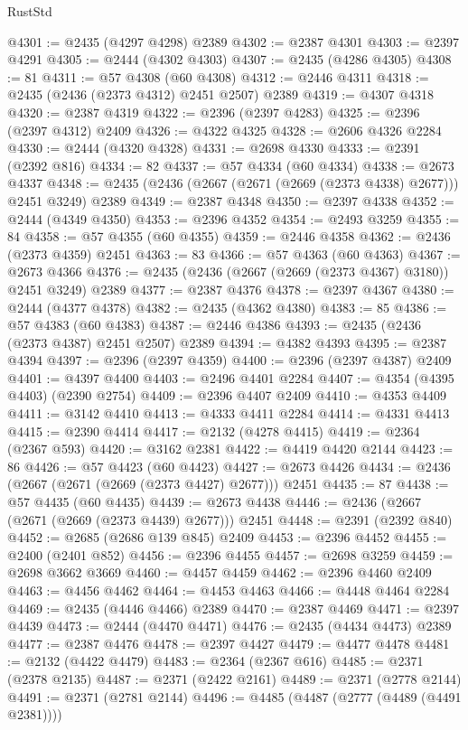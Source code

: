 \begin{lexlean}{RustStd}
\begin{coremodule}
@4301 := @2435 (@4297 @4298) @2389
@4302 := @2387 @4301
@4303 := @2397 @4291
@4305 := @2444 (@4302 @4303)
@4307 := @2435 (@4286 @4305)
@4308 := 81
@4311 := @57 @4308 (@60 @4308)
@4312 := @2446 @4311
@4318 := @2435 (@2436 (@2373 @4312) @2451 @2507) @2389
@4319 := @4307 @4318
@4320 := @2387 @4319
@4322 := @2396 (@2397 @4283)
@4325 := @2396 (@2397 @4312) @2409
@4326 := @4322 @4325
@4328 := @2606 @4326 @2284
@4330 := @2444 (@4320 @4328)
@4331 := @2698 @4330
@4333 := @2391 (@2392 @816)
@4334 := 82
@4337 := @57 @4334 (@60 @4334)
@4338 := @2673 @4337
@4348 := @2435 (@2436 (@2667 (@2671 (@2669 (@2373 @4338) @2677))) @2451 @3249) @2389
@4349 := @2387 @4348
@4350 := @2397 @4338
@4352 := @2444 (@4349 @4350)
@4353 := @2396 @4352
@4354 := @2493 @3259
@4355 := 84
@4358 := @57 @4355 (@60 @4355)
@4359 := @2446 @4358
@4362 := @2436 (@2373 @4359) @2451
@4363 := 83
@4366 := @57 @4363 (@60 @4363)
@4367 := @2673 @4366
@4376 := @2435 (@2436 (@2667 (@2669 (@2373 @4367) @3180)) @2451 @3249) @2389
@4377 := @2387 @4376
@4378 := @2397 @4367
@4380 := @2444 (@4377 @4378)
@4382 := @2435 (@4362 @4380)
@4383 := 85
@4386 := @57 @4383 (@60 @4383)
@4387 := @2446 @4386
@4393 := @2435 (@2436 (@2373 @4387) @2451 @2507) @2389
@4394 := @4382 @4393
@4395 := @2387 @4394
@4397 := @2396 (@2397 @4359)
@4400 := @2396 (@2397 @4387) @2409
@4401 := @4397 @4400
@4403 := @2496 @4401 @2284
@4407 := @4354 (@4395 @4403) (@2390 @2754)
@4409 := @2396 @4407 @2409
@4410 := @4353 @4409
@4411 := @3142 @4410
@4413 := @4333 @4411 @2284
@4414 := @4331 @4413
@4415 := @2390 @4414
@4417 := @2132 (@4278 @4415)
@4419 := @2364 (@2367 @593)
@4420 := @3162 @2381
@4422 := @4419 @4420 @2144
@4423 := 86
@4426 := @57 @4423 (@60 @4423)
@4427 := @2673 @4426
@4434 := @2436 (@2667 (@2671 (@2669 (@2373 @4427) @2677))) @2451
@4435 := 87
@4438 := @57 @4435 (@60 @4435)
@4439 := @2673 @4438
@4446 := @2436 (@2667 (@2671 (@2669 (@2373 @4439) @2677))) @2451
@4448 := @2391 (@2392 @840)
@4452 := @2685 (@2686 @139 @845) @2409
@4453 := @2396 @4452
@4455 := @2400 (@2401 @852)
@4456 := @2396 @4455
@4457 := @2698 @3259
@4459 := @2698 @3662 @3669
@4460 := @4457 @4459
@4462 := @2396 @4460 @2409
@4463 := @4456 @4462
@4464 := @4453 @4463
@4466 := @4448 @4464 @2284
@4469 := @2435 (@4446 @4466) @2389
@4470 := @2387 @4469
@4471 := @2397 @4439
@4473 := @2444 (@4470 @4471)
@4476 := @2435 (@4434 @4473) @2389
@4477 := @2387 @4476
@4478 := @2397 @4427
@4479 := @4477 @4478
@4481 := @2132 (@4422 @4479)
@4483 := @2364 (@2367 @616)
@4485 := @2371 (@2378 @2135)
@4487 := @2371 (@2422 @2161)
@4489 := @2371 (@2778 @2144)
@4491 := @2371 (@2781 @2144)
@4496 := @4485 (@4487 (@2777 (@4489 (@4491 @2381))))

\end{coremodule}
\end{lexlean}
